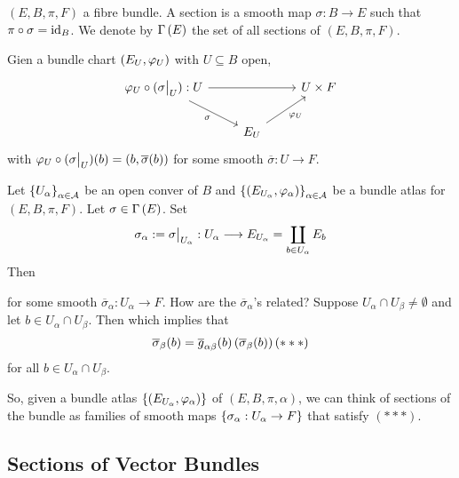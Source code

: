 \documentclass[main.tex]{subfiles}
\begin{document}
 $(E, B, \pi, F)$ a fibre bundle. A section is a smooth map $\sigma: B \to E$ such that $\pi \circ \sigma = \text{id}_{B}$. We denote by $\Gamma\left( E \right)$ the set of all sections of $(E, B, \pi, F)$.

Gien a bundle chart $\left(  E_U, \varphi_U \right)$ with $U \subseteq B$ open,
\[
\begin{tikzcd}
\varphi_U \circ (\sigma \big|_U) : U \arrow[rd, "\sigma"'] \arrow[rr] &                              & U \times F \\
                                                                      & E_U \arrow[ru, "\varphi_U"'] &
\end{tikzcd}
\]
with $\varphi_U \circ (\sigma\big|_{U})(b) = (b, \overline{\sigma}(b))$ for some smooth $\overline{\sigma}: U \to F.$

Let $\left\{U_\alpha\right\}_{\alpha \in \mathcal{A}}$ be an open conver of $B$
 and $\left\{ \left( E_{U_\alpha}, \varphi_\alpha \right) \right\}_{\alpha \in \mathcal{A}}$ be
 a bundle atlas for $(E, B, \pi, F)$. Let $\sigma \in \Gamma\left( E \right)$. Set
 \[
 \sigma_\alpha := \sigma\big|_{U_\alpha}: U_\alpha \longrightarrow E_{U_\alpha} = \coprod_{b \in U_\alpha} E_b
 \]
 Then

 for some smooth $\overline{\sigma}_\alpha: U_\alpha \to F$. How are the $\overline{\sigma}_\alpha$'s related? Suppose $U_\alpha \cap U_\beta \neq \emptyset$  and let $b \in U_\alpha \cap U_\beta$. Then
 which implies that
 \[
    \overline{\sigma}_\beta(b) = \overline{g}_{\alpha\beta}(b)\left( \overline{\sigma}_\beta(b)  \right) (***)
 \] for all $b \in U_\alpha \cap U_\beta$.

 So, given a bundle atlas $\left\{ \left(  E_{U_\alpha}, \varphi_\alpha  \right)  \right\}$ of $(E, B, \pi, \alpha)$, we can think of sections of the bundle as families of smooth maps $\left\{ \sigma_\alpha : U_\alpha \to F\right\}$ that satisfy $(***)$.

 \subsection{Sections of Vector Bundles}
\end{document}
